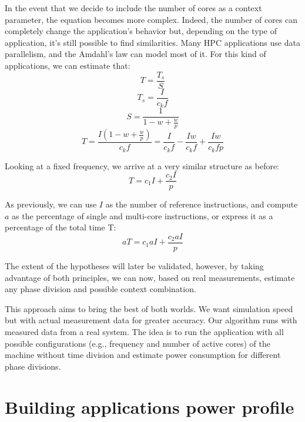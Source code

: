 In the event that we decide to include the number of cores as a context parameter, the equation becomes more complex. Indeed, the number of cores can completely change the application's behavior but, depending on the type of application, it's still possible to find similarities. Many HPC applications use data parallelism, and the Amdahl's law can model most of it. For this kind of applications, we can estimate that:
\begin{equation}
	T=\frac{T_s}{S}
\end{equation}
\begin{equation}
	T_s=\frac{I}{c_kf}
\end{equation}
\begin{equation}
	S=\frac{1}{1-w+\frac{w}{p}}
\end{equation}
\begin{equation}
	T=\frac{I(1-w+\frac{w}{p})}{c_kf}=\frac{I}{c_kf}-\frac{Iw}{c_kf}+\frac{Iw}{c_kfp}
\end{equation}

Looking at a fixed frequency, we arrive at a very similar structure as before:
\begin{equation}
	T=c_1I+\frac{c_2I}{p}
\end{equation}

As previously, we can use $I$ as the number of reference instructions, and compute $a$ as the percentage of single and multi-core instructions, or express it as a percentage of the total time T:
\begin{equation}
	aT=c_1aI+\frac{c_2aI}{p}
\end{equation}

The extent of the hypotheses will later be validated, however, by taking advantage of both principles, we can now, based on real measurements, estimate any phase division and possible context combination.
\fi %

This approach aims to bring the best of both worlds. We want simulation speed but with actual measurement data for greater accuracy. Our algorithm runs with measured data from a real system. The idea is to run the application with all possible configurations (e.g., frequency and number of active cores) of the machine without time division and estimate power consumption for different phase divisions.


\section{Building applications power profile} \label{sec:building_a_database}


